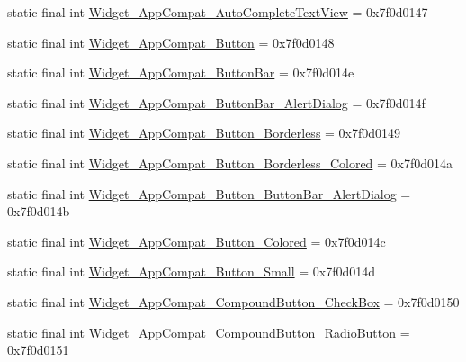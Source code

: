 \begin{DoxyCompactItemize}
\item 
static final int \mbox{\hyperlink{classcom_1_1google_1_1android_1_1gms_1_1R_1_1style_a87fdda4b8f940494aded948738345a5f}{Widget\+\_\+\+App\+Compat\+\_\+\+Auto\+Complete\+Text\+View}} = 0x7f0d0147
\item 
static final int \mbox{\hyperlink{classcom_1_1google_1_1android_1_1gms_1_1R_1_1style_a3adcbf0a817532c2458fa9dfe5bd3c37}{Widget\+\_\+\+App\+Compat\+\_\+\+Button}} = 0x7f0d0148
\item 
static final int \mbox{\hyperlink{classcom_1_1google_1_1android_1_1gms_1_1R_1_1style_ad9cee1eca9ef94457efe577587a504bf}{Widget\+\_\+\+App\+Compat\+\_\+\+Button\+Bar}} = 0x7f0d014e
\item 
static final int \mbox{\hyperlink{classcom_1_1google_1_1android_1_1gms_1_1R_1_1style_a8be50820eeabfb72d0b8ab6470bc1680}{Widget\+\_\+\+App\+Compat\+\_\+\+Button\+Bar\+\_\+\+Alert\+Dialog}} = 0x7f0d014f
\item 
static final int \mbox{\hyperlink{classcom_1_1google_1_1android_1_1gms_1_1R_1_1style_a4c3062808741cd60a3107c41d608c54a}{Widget\+\_\+\+App\+Compat\+\_\+\+Button\+\_\+\+Borderless}} = 0x7f0d0149
\item 
static final int \mbox{\hyperlink{classcom_1_1google_1_1android_1_1gms_1_1R_1_1style_a37e95e74c9ba9acac0dca57730066fdc}{Widget\+\_\+\+App\+Compat\+\_\+\+Button\+\_\+\+Borderless\+\_\+\+Colored}} = 0x7f0d014a
\item 
static final int \mbox{\hyperlink{classcom_1_1google_1_1android_1_1gms_1_1R_1_1style_ac19d0a9abf8698731d4bfe65be632fd9}{Widget\+\_\+\+App\+Compat\+\_\+\+Button\+\_\+\+Button\+Bar\+\_\+\+Alert\+Dialog}} = 0x7f0d014b
\item 
static final int \mbox{\hyperlink{classcom_1_1google_1_1android_1_1gms_1_1R_1_1style_a98a2a383cc4993472b3ea73370111c9c}{Widget\+\_\+\+App\+Compat\+\_\+\+Button\+\_\+\+Colored}} = 0x7f0d014c
\item 
static final int \mbox{\hyperlink{classcom_1_1google_1_1android_1_1gms_1_1R_1_1style_a48cae315f242a132c9047ca6da3af0ea}{Widget\+\_\+\+App\+Compat\+\_\+\+Button\+\_\+\+Small}} = 0x7f0d014d
\item 
static final int \mbox{\hyperlink{classcom_1_1google_1_1android_1_1gms_1_1R_1_1style_a788088b87cbfb6382608918408c9ff49}{Widget\+\_\+\+App\+Compat\+\_\+\+Compound\+Button\+\_\+\+Check\+Box}} = 0x7f0d0150
\item 
static final int \mbox{\hyperlink{classcom_1_1google_1_1android_1_1gms_1_1R_1_1style_a6596e8b1c7f002650a76e9b7f90ba9df}{Widget\+\_\+\+App\+Compat\+\_\+\+Compound\+Button\+\_\+\+Radio\+Button}} = 0x7f0d0151

\end{DoxyCompactItemize}
